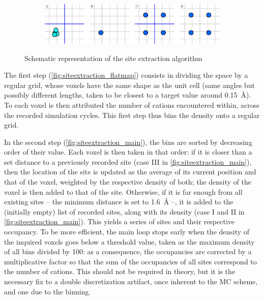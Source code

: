 \documentclass[main.tex]{subfiles}
\begin{document}
\begin{figure}
	\begin{subfigure}{\linewidth}
		\includegraphics[width=\linewidth]{figures/cations/siteextraction_symm.pdf}
		\label{fig:siteextraction_symm}
	\end{subfigure}
	
	\caption{Schematic representation of the site extraction algorithm}\label{fig:siteextraction}
\end{figure}

The first step (\cref{fig:siteextraction_flatmap}) consists in dividing the space by a regular grid, whose voxels have the same shape as the unit cell (same angles but possibly different lengths, taken to be closest to a target value around \qty{0.15}{\angstrom}). To each voxel is then attributed the number of cations encountered within, across the recorded simulation cycles. This first step thus bins the density onto a regular grid.

In the second step (\cref{fig:siteextraction_main}), the bins are sorted by decreasing order of their value. Each voxel is then taken in that order: if it is closer than a set distance to a previously recorded site (case III in \cref{fig:siteextraction_main}), then the location of the site is updated as the average of its current position and that of the voxel, weighted by the respective density of both; the density of the voxel is then added to that of the site. Otherwise, if it is far enough from all existing sites -- the minimum distance is set to \qty{1.6}{\angstrom} --, it is added to the (initially empty) list of recorded sites, along with its density (case I and II in \cref{fig:siteextraction_main}). This yields a series of sites and their respective occupancy. To be more efficient, the main loop stops early when the density of the inquired voxels goes below a threshold value, taken as the maximum density of all bins divided by 100: as a consequence, the occupancies are corrected by a multiplicative factor so that the sum of the occupancies of all sites correspond to the number of cations. This should not be required in theory, but it is the necessary fix to a double discretization artifact, once inherent to the MC scheme, and one due to the binning.
\end{document}
